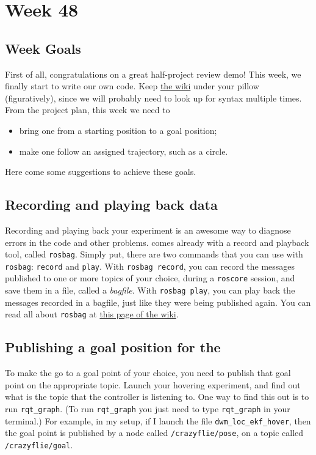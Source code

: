 \chapter*{Week 48}



\section*{Week Goals}

First of all, congratulations on a great half-project review demo!
This week, we finally start to write our own code.
Keep \href{http://wiki.ros.org}{the \ROS{} wiki} under your pillow (figuratively), since we will probably need to look up for syntax multiple times.
From the project plan, this week we need to
\begin{itemize}
\item bring one \CF{} from a starting position to a goal position;
\item make one \CF{} follow an assigned trajectory, such as a circle.
\end{itemize}
Here come some suggestions to achieve these goals.


\section*{Recording and playing back data}

Recording and playing back your experiment is an awesome way to diagnose errors in the code and other problems.
\ROS{} comes already with a record and playback tool, called \lstinline|rosbag|.
Simply put, there are two commands that you can use with \lstinline|rosbag|: \lstinline|record| and \lstinline|play|.
With \lstinline|rosbag record|, you can record the messages published to one or more topics of your choice, during a \lstinline|roscore| session, and save them in a file, called a \emph{bagfile}.
With \lstinline|rosbag play|, you can play back the messages recorded in a bagfile, just like they were being published again.
You can read all about \lstinline|rosbag| at \href{http://wiki.ros.org/rosbag}{this page of the \ROS{} wiki}.


\section*{Publishing a goal position for the \CF{}}

To make the \CF{} go to a goal point of your choice, you need to publish that goal point on the appropriate topic.
Launch your hovering experiment, and find out what is the topic that the controller is listening to.
One way to find this out is to run \lstinline|rqt_graph|.
(To run \lstinline|rqt_graph| you just need to type \lstinline|rqt_graph| in your terminal.)
For example, in my setup, if I launch the file \lstinline|dwm_loc_ekf_hover|, then the goal point is published by a node called \lstinline|/crazyflie/pose|, on a topic called \lstinline|/crazyflie/goal|.

